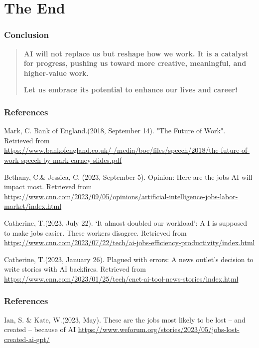 \documentclass{beamer}
\begin{document}
    \section{The End}

    \begin{frame}
        \frametitle{Conclusion}
            \begin{quote}
                \textbf{ AI will not replace us but \textcolor{structure}{\large reshape how
                        we work}. It is a catalyst for progress, pushing us toward more creative,
                        meaningful, and higher-value work.}        
                        \newline
                        \begin{center}
                        \textbf{\textcolor{structure}{\Large Let us embrace its potential to enhance our lives and career!}}
                \end{center}
            \end{quote}   
    \end{frame}

    \begin{frame}
        \frametitle{References}
        \begin{thebibliography}{}

            Mark, C. Bank of England.(2018, September 14). "The Future of Work".
            Retrieved from \url{https://www.bankofengland.co.uk/-/media/boe/files/speech/2018/the-future-of-work-speech-by-mark-carney-slides.pdf}
            
            Bethany, C.\& Jessica, C. (2023, September 5). Opinion: Here are the jobs AI will impact most. 
            Retrieved from \url{https://www.cnn.com/2023/09/05/opinions/artificial-intelligence-jobs-labor-market/index.html}
            
            Catherine, T.(2023, July 22). ‘It almost doubled our workload’: A
            I is supposed to make jobs easier. These workers disagree. 
            Retrieved from \url{https://www.cnn.com/2023/07/22/tech/ai-jobs-efficiency-productivity/index.html}
            
            Catherine, T.(2023, January 26). Plagued with errors: 
            A news outlet’s decision to write stories with AI backfires. 
            Retrieved from \url{https://www.cnn.com/2023/01/25/tech/cnet-ai-tool-news-stories/index.html}
            \end{thebibliography}
    \end{frame}
    \begin{frame}
        \frametitle{References}
    \begin{thebibliography}{}   
        Ian, S. \& Kate, W.(2023, May). These are the jobs most likely to be lost – and created – because of AI \url{https://www.weforum.org/stories/2023/05/jobs-lost-created-ai-gpt/}
        
        \end{thebibliography}
    \end{frame}
            

    \QApage
\end{document}

